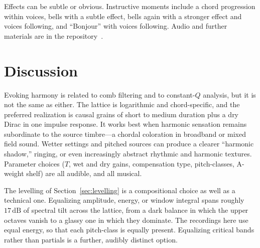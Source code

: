 \documentclass[runningheads,a4paper]{llncs}
\begin{document}
Effects can be subtle or obvious. Instructive moments include a chord progression within voices,
bells with a subtle effect, bells again with a stronger effect and voices 
following, and ``Bonjour'' with voices following. Audio and further materials are in the
repository~\cite{evoking_harmony_sound_walk,gogins_github_io}.

\section{Discussion}

Evoking harmony is related to comb filtering and to constant-$Q$ analysis, but
it is not the same as either. The lattice is logarithmic and chord-specific, and
the preferred realization is causal grains of short to medium duration plus a
dry Dirac in one impulse response. It works best when harmonic sensation remains
subordinate to the source timbre---a chordal coloration in broadband or mixed
field sound. Wetter settings and pitched sources can produce a clearer
``harmonic shadow,'' ringing, or even increasingly abstract rhythmic and harmonic
textures. Parameter choices ($T$, wet and dry gains, compensation type,
pitch-classes, A-weight shelf) are all audible, and all musical.

The levelling of Section~\ref{sec:levelling} is a compositional choice as well
as a technical one. Equalizing amplitude, energy, or window integral spans
roughly $17\,\mathrm{dB}$ of spectral tilt across the lattice, from a dark
balance in which the upper octaves vanish to a glassy one in which they
dominate. The recordings here use equal energy, so that each pitch-class is
equally present. Equalizing critical bands rather than partials is a further,
audibly distinct option.



\end{document}
